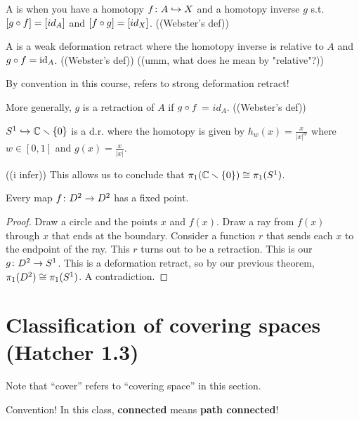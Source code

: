 \documentclass[11pt,leqno,oneside]{amsart}
\newenvironment{dateenv}{
  \vspace{1em}
}{
  \vspace{1em}
}
\newcommand{\mydate}[4]{
  \newdate{#1}{#2}{#3}{#4}
  \begin{dateenv}
    \hfill\displaydate{#1}
  \end{dateenv}
}
\numberwithin{thm}{section}
\newcommand{\minus}{\smallsetminus}
\newcommand{\fund}[1][1]{\pi_{#1}}
\newcommand{\id}{\text{id}}
\begin{document}
\begin{defn}
  A  is when you have a homotopy $f\colon A \hookrightarrow X$ and a homotopy inverse $g$ s.t. $[g \circ f] = [id_A]$ and $[f \circ g] = [id_X]$. ((Webster's def))
\end{defn}
\begin{defn}
  A  is a weak deformation retract where the homotopy inverse is relative to $A$ and $g \of f = \id_A$. ((Webster's def)) ((umm, what does he mean by "relative"?))
\end{defn}
By convention in this course,  refers to strong deformation retract!
\begin{rmk}
  More generally, $g$ is a retraction of $A$ if $g \circ f$ = $id_A$. ((Webster's def))
\end{rmk}
\begin{example}
  $S^1 \into \C\minus\{0\}$ is a d.r. where the homotopy is given by $h_w(x) = \frac{x}{|x|^w}$ where $w \in [0,1]$  and $g(x) = \frac{x}{|x|}$.

  ((i infer)) This allows us to conclude that $\fund(\C\minus\{0\}) \isom \fund(S^1)$.
\end{example}
\begin{thm}
  Every map $f\colon D^2 \to D^2$ has a fixed point.
\end{thm}



\begin{proof}
  Draw a circle and the points $x$ and $f(x)$.  Draw a ray from $f(x)$ through $x$ that ends at the boundary.  Consider a function $r$ that sends each $x$ to the endpoint of the ray.  This $r$ turns out to be a retraction.  This is our $g\colon D^2 \to S^1$.  This is a deformation retract, so by our previous theorem, $\fund(D^2) \isom \fund(S^1)$.  A contradiction.
\end{proof}

\mydate{d8}{13}{2}{2017}

\section{Classification of covering spaces (Hatcher 1.3)}

Note that ``cover'' refers to ``covering space'' in this section.

Convention!  In this class, \textbf{connected} means \textbf{path connected}!
\end{document}
